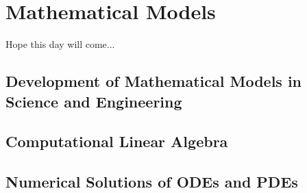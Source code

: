 \chapter{Mathematical Models} \label{chap-math}
Hope this day will come...
\section{Development of Mathematical Models in Science and Engineering}
\section{Computational Linear Algebra}
\section{Numerical Solutions of ODEs and PDEs}
